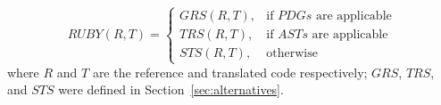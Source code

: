 $$
RUBY(R, T) = \begin{cases}
				GRS(R, T), 	& \mbox{if } PDGs\mbox{ are applicable} \\
				TRS(R, T), 	& \mbox{if } ASTs\mbox{ are applicable} \\
				STS(R, T), 	& \mbox{otherwise}
			\end{cases}
$$
where $R$ and $T$ are the reference and translated code respectively;
$GRS$, $TRS$, and $STS$ were defined in Section~\ref{sec:alternatives}.








